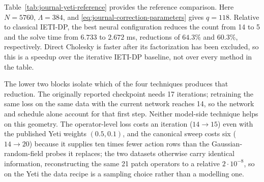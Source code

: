 \documentclass{article}
\theoremstyle{plain}
\numberwithin{equation}{section}
\begin{document}
\begin{table}[p]
    \centering
    \small
    \caption{Yeti reference problem at $(p,r)=(2,2)$, with the technique
        ablation.  $T_{\rm solve}$ excludes setup; $T_{\rm setup}$ covers
        everything before the first iteration, the parenthesised value
        removing the one-off ONNX model load.  A dash denotes the
        non-iterative direct solver.  Techniques are stated relative to the
        originally reported recipe: $L$ replaces the sampled-action $\ell_2$
        loss by the operator-level loss of
        Section~\ref{subsec:native-data}; $D$ replaces the original
        Gaussian-random-field probes by the canonical basis sweep; $C$ is the
        setup-time rank-four local calibration; $G$ is the adaptive interface
        correction.  The four $(L,D)$ cells share one network, optimizer,
        schedule, split rule and seed, so that $L$ and $D$ are isolated, and
        each uses the published operator-loss weights for its problem; the
        original block keeps the smaller network, so the gap between it and
        the matched $L\circ D\circ C\circ G\circ$ row measures the network
        and schedule change alone.  Every row is one thread, 30 measured
        solves, tolerance $10^{-8}$, and comes from a single campaign.
        $^{\dagger}$On the Yeti the matrix-free search certifies none of the
        118 requested Ritz modes for scaled Dirichlet, because the exact
        $\mathcal{P}_0$ is singular there;
        that row therefore coincides with unmodified IETI-DP, while all 118
        are certified for every neural row.}
    \label{tab:journal-yeti-reference}
    
\end{table}

Table~\ref{tab:journal-yeti-reference} provides the reference comparison.
Here $N=5760$, $\Lambda=384$, and
\eqref{eq:journal-correction-parameters} gives $q=118$.  Relative to
classical IETI-DP, the best neural configuration reduces the count from 14 to
5 and the solve time from $6.733$ to $2.672$ ms, reductions of $64.3\%$ and
$60.3\%$, respectively.  Direct Cholesky is faster after its factorization has
been excluded, so this is a speedup over the iterative IETI-DP baseline, not
over every method in the table.

The lower two blocks isolate which of the four techniques produces that
reduction.  The originally reported checkpoint needs 17 iterations; retraining
the same loss on the same data with the current network reaches 14, so the
network and schedule alone account for that first step.  Neither model-side
technique helps on this geometry.  The operator-level loss costs an iteration
($14\to15$) even with the published Yeti weights $(0.5,0.1)$, and the
canonical sweep costs six ($14\to20$) because it supplies ten times fewer
action rows than the Gaussian-random-field probes it replaces; the two
datasets otherwise carry identical information, reconstructing the same 21
patch operators to a relative $2\cdot10^{-8}$, so on the Yeti the data recipe
is a sampling choice rather than a modelling one.
\end{document}
